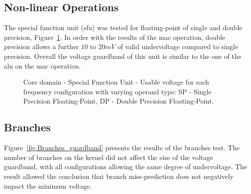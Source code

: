 \subsection{Non-linear Operations}

The special function unit (\acrshort{sfu}) was tested for floating-point of single and double precision, Figure~\ref{fig:SFU_guardband}. In order with the results of the \acrshort{mac} operation, double precision allows a further $10$ to $20mV$ of valid undervoltage compared to single precision. Overall the voltage guardband of this unit is similar to the one of the \acrshort{alu} on the \acrshort{mac} operation. 



\begin{figure}[!htb]
    \centering
    \begin{subfigmatrix}{2}
      \label{fig:SFU_guardband}
    \end{subfigmatrix}
    \caption{Core domain - Special Function Unit - Usable voltage for each frequency configuration with varying operand type: SP - Single Precision Floating-Point, DP - Double Precision Floating-Point.}
\end{figure}

\subsection{Branches}


Figure~\ref{fig:Branches_guardband} presents the results of the branches test. The number of branches on the kernel did not affect the size of the voltage guardband, with all configurations allowing the same degree of undervoltage.
The result allowed the conclusion that branch miss-prediction does not negatively impact the minimum voltage.

